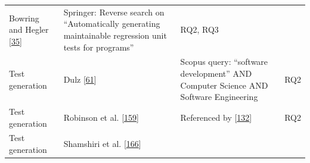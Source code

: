 \documentclass[]{book}
\begin{document}
\begin{longtable}[]{@{}llll@{}}
\begin{minipage}[t]{0.16\columnwidth}
Bowring and Hegler
{[}\protect\hyperlink{ref-bowring2014obsidian}{35}{]}\strut
\end{minipage} & \begin{minipage}[t]{0.50\columnwidth}\raggedright\strut
Springer: Reverse search on ``Automatically generating maintainable
regression unit tests for programs''\strut
\end{minipage} & \begin{minipage}[t]{0.04\columnwidth}\raggedright\strut
RQ2, RQ3\strut
\end{minipage}\tabularnewline
\begin{minipage}[t]{0.18\columnwidth}\raggedright\strut
Test generation\strut
\end{minipage} & \begin{minipage}[t]{0.16\columnwidth}\raggedright\strut
Dulz {[}\protect\hyperlink{ref-dulz2013model}{61}{]}\strut
\end{minipage} & \begin{minipage}[t]{0.50\columnwidth}\raggedright\strut
Scopus query: ``software development'' AND Computer Science AND Software
Engineering\strut
\end{minipage} & \begin{minipage}[t]{0.04\columnwidth}\raggedright\strut
RQ2\strut
\end{minipage}\tabularnewline
\begin{minipage}[t]{0.18\columnwidth}\raggedright\strut
Test generation\strut
\end{minipage} & \begin{minipage}[t]{0.16\columnwidth}\raggedright\strut
Robinson et al. {[}\protect\hyperlink{ref-robinson2011}{159}{]}\strut
\end{minipage} & \begin{minipage}[t]{0.50\columnwidth}\raggedright\strut
Referenced by
{[}\protect\hyperlink{ref-supportingtestsuite}{132}{]}\strut
\end{minipage} & \begin{minipage}[t]{0.04\columnwidth}\raggedright\strut
RQ2\strut
\end{minipage}\tabularnewline
\begin{minipage}[t]{0.18\columnwidth}\raggedright\strut
Test generation\strut
\end{minipage} & \begin{minipage}[t]{0.16\columnwidth}\raggedright\strut
Shamshiri et al.
{[}\protect\hyperlink{ref-shamshiri2018automatically}{166}{]}\strut
\end{minipage} & \begin{minipage}[t]{0.50\columnwidth}\raggedright\strut

\end{minipage}
\end{longtable}
\end{document}
